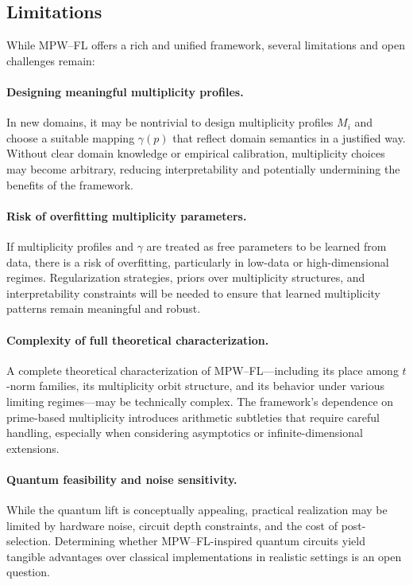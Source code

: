 \documentclass[11pt]{article}
\begin{document}
\subsection{Limitations}
\label{subsec:limitations}

While MPW--FL offers a rich and unified framework, several limitations and open challenges remain:

\paragraph{Designing meaningful multiplicity profiles.}
In new domains, it may be nontrivial to design multiplicity profiles $M_i$ and choose a suitable mapping $\gamma(p)$ that reflect domain semantics in a justified way. Without clear domain knowledge or empirical calibration, multiplicity choices may become arbitrary, reducing interpretability and potentially undermining the benefits of the framework.

\paragraph{Risk of overfitting multiplicity parameters.}
If multiplicity profiles and $\gamma$ are treated as free parameters to be learned from data, there is a risk of overfitting, particularly in low-data or high-dimensional regimes. Regularization strategies, priors over multiplicity structures, and interpretability constraints will be needed to ensure that learned multiplicity patterns remain meaningful and robust.

\paragraph{Complexity of full theoretical characterization.}
A complete theoretical characterization of MPW--FL—including its place among $t$-norm families, its multiplicity orbit structure, and its behavior under various limiting regimes—may be technically complex. The framework’s dependence on prime-based multiplicity introduces arithmetic subtleties that require careful handling, especially when considering asymptotics or infinite-dimensional extensions.

\paragraph{Quantum feasibility and noise sensitivity.}
While the quantum lift is conceptually appealing, practical realization may be limited by hardware noise, circuit depth constraints, and the cost of post-selection. Determining whether MPW--FL-inspired quantum circuits yield tangible advantages over classical implementations in realistic settings is an open question.
\end{document}
